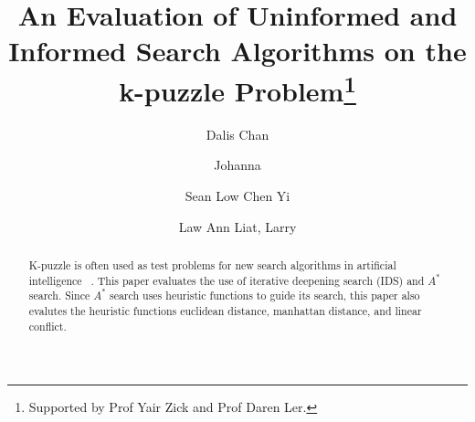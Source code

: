 \documentclass[runningheads]{llncs}
\begin{document}
%
\title{An Evaluation of Uninformed and Informed Search Algorithms on the k-puzzle Problem\thanks{Supported by Prof Yair Zick and Prof Daren Ler.}}
%
%
\author{Dalis Chan \and
Johanna  \and
Sean Low Chen Yi  \and 
Law Ann Liat, Larry }
%
%

%
\maketitle              %
%
\begin{abstract}
K-puzzle is often used as test problems for new search algorithms in artificial intelligence ~\cite[p71]{stuart_russell_artifical_2010}. This paper evaluates the use of iterative deepening search (IDS) and \( A^* \) search. 
Since \( A^* \) search uses heuristic functions to guide its search, this paper also evalutes the heuristic functions euclidean distance, manhattan distance, and linear conflict.
\end{abstract}
%
%
%
\end{document}
